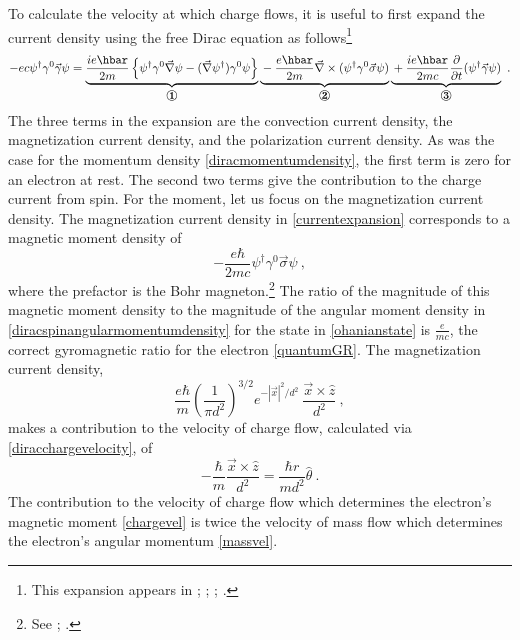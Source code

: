 \documentclass[onecolumn,secnumarabic,amsmath,amssymb,balancelastpage,nofootinbib]{article}
\begin{document}
To calculate the velocity at which charge flows, it is useful to first expand the current density using the free Dirac equation as follows\footnote{This expansion appears in \citet{gordon1928}; \citet[pg.\ 321--322]{frenkel}; \citet[pg.\ 479]{huang1952}; \citet[pg.\ 504]{ohanian}.}
 \begin{equation}
 -e c \psi^\dagger \gamma^{0} \vec{\gamma} \psi = \underbrace{\strut \frac{i e\hbar}{2 m}\left\{\psi^\dagger \gamma^0 \vec{\nabla} \psi - (\vec{\nabla} \psi^\dagger) \gamma^0\psi\right\}}_{\text{\large{\ding{172}}}}\underbrace{\strut  - \frac{e\hbar}{2 m} \vec{\nabla}\times(\psi^\dagger \gamma^0 \vec{\sigma}\psi)}_{\text{\large{\ding{173}}}}\underbrace{\strut  +\frac{i e\hbar}{2 m c}\frac{\partial}{\partial t}(\psi^\dagger \vec{\gamma} \psi)}_{\text{\large{\ding{174}}}}\ .
\label{currentexpansion}
 \end{equation}
The three terms in the expansion are the convection current density, the magnetization current density, and the polarization current density.  As was the case for the momentum density \eqref{diracmomentumdensity}, the first term is zero for an electron at rest.  The second two terms give the contribution to the charge current from spin.  For the moment, let us focus on the magnetization current density.  The magnetization current density in \eqref{currentexpansion} corresponds to a magnetic moment density of
\begin{equation}
- \frac{e\hbar}{2 m c} \psi^\dagger \gamma^0 \vec{\sigma}\psi\ ,
\label{magneticmomentdensity}
\end{equation}
where the prefactor is the Bohr magneton.\footnote{See \citet[section 5.6]{jackson}; \citet[pg. 504]{ohanian}.}  The ratio of the magnitude of this magnetic moment density to the magnitude of the angular moment density in \eqref{diracspinangularmomentumdensity} for the state in \eqref{ohanianstate} is $\frac{e}{m c}$, the correct gyromagnetic ratio for the electron \eqref{quantumGR}.  The magnetization current density,
\begin{equation}
\frac{e \hbar}{m}\left(\frac{1}{\pi d^2}\right)^{3/2}e^{-|\vec{x}|^2/d^2}\ \frac{\vec{x}\times\hat{z}}{d^2}\ ,
\label{magcurrent}
\end{equation}
makes a contribution to the velocity of charge flow, calculated via \eqref{diracchargevelocity}, of
\begin{equation}
-\frac{\hbar}{m}\frac{\vec{x}\times\hat{z}}{d^2}=\frac{\hbar r}{m d^2} \hat{\theta}\ .
\label{chargevel}
\end{equation}
The contribution to the velocity of charge flow which determines the electron's magnetic moment \eqref{chargevel} is twice the velocity of mass flow which determines the electron's angular momentum \eqref{massvel}.
\end{document}
